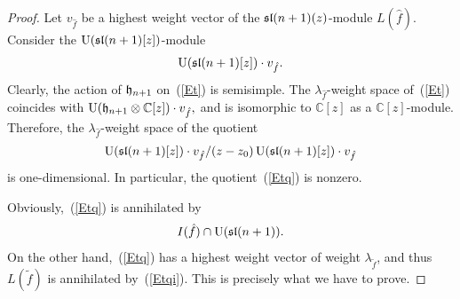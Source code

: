 \documentclass[10pt]{amsart}\oddsidemargin -1mm \evensidemargin -1mm \topmargin -15mm\headheight5mm \headsep 3.5mm \textheight 245mm\textwidth 170mm %
\theoremstyle{definition}\newtheorem{theorem}{Theorem}[section]\newtheorem{lemma}[theorem]{Lemma}\newtheorem{remark}[theorem]{Remark}\newtheorem{proposition}[theorem]{Proposition}\newtheorem{corollary}[theorem]{Corollary}\newtheorem{definition}[theorem]{Definition}\newtheorem{Ex}[theorem]{Example}
\begin{document}
\begin{proof}
Let $v_{\hat f}$ be a highest weight vector of the $\frak{sl}(n+1)(z)$-module $L(\hat f)$. %
Consider the  $\operatorname{\mathrm{U}}(\frak{sl}(n+1)[z])$-module\begin{equation}\operatorname{\mathrm{U}}(\frak{sl}(n+1)[z])\cdot v_{\hat f}.\label{Et}\end{equation} Clearly, the action of $\frak h_{n+1}$ on~(\ref{Et}) is semisimple. The $\lambda_{\hat f}$-weight space of~(\ref{Et}) coincides with $\operatorname{\mathrm{U}}(\frak h_{n+1}\otimes\mathbb C[z])\cdot v_{\hat f},$ and is isomorphic to $\mathbb C[z]$ as a $\mathbb C[z]$-module. Therefore, the $\lambda_{\hat f}$-weight space of the quotient \begin{equation}\operatorname{\mathrm{U}}(\frak{sl}(n+1)[z])\cdot v_{\hat f}/(z-z_0)\operatorname{\mathrm{U}}(\frak{sl}(n+1)[z])\cdot v_{\hat f}\label{Etq}\end{equation} is one-dimensional. In particular, the quotient~(\ref{Etq}) is nonzero.

Obviously,~(\ref{Etq}) is annihilated by \begin{equation}I(\hat f)\cap\operatorname{\mathrm{U}}(\frak{sl}(n+1)).\label{Etqi}\end{equation} On the other hand,~(\ref{Etq}) has a highest weight vector of weight $\lambda_{\tilde f}$, and thus $L(\tilde f)$ is annihilated by~(\ref{Etqi}). This is precisely what we have to prove.
\end{proof}
\end{document}
